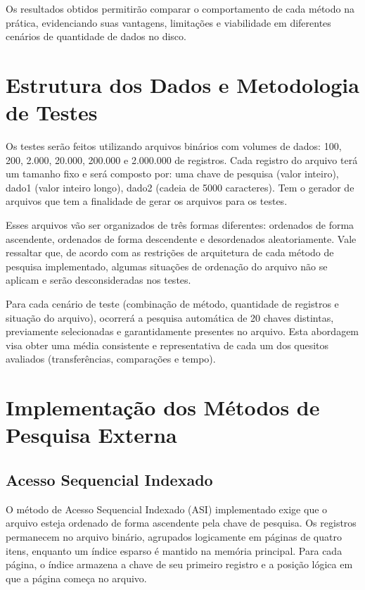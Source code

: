 \documentclass[12pt,a4paper]{article}
\begin{document}
Os resultados obtidos permitirão comparar o comportamento de cada método na prática, evidenciando suas vantagens, limitações e viabilidade em diferentes cenários de quantidade de dados no disco.

\section{Estrutura dos Dados e Metodologia de Testes}

Os testes serão feitos utilizando arquivos binários com volumes de dados: 100, 200, 2.000, 20.000, 200.000 e 2.000.000 de registros. Cada registro do arquivo terá um tamanho fixo e será composto por: uma chave de pesquisa (valor inteiro), dado1 (valor inteiro longo), dado2 (cadeia de 5000 caracteres). Tem o gerador de arquivos que tem a finalidade de gerar os arquivos para os testes. 

Esses arquivos vão ser organizados de três formas diferentes: ordenados de forma ascendente, ordenados de forma descendente e desordenados aleatoriamente. Vale ressaltar que, de acordo com as restrições de arquitetura de cada método de pesquisa implementado, algumas situações de ordenação do arquivo não se aplicam e serão desconsideradas nos testes.

Para cada cenário de teste (combinação de método, quantidade de registros e situação do arquivo), ocorrerá a pesquisa automática de 20 chaves distintas, previamente selecionadas e garantidamente presentes no arquivo. Esta abordagem visa obter uma média consistente e representativa de cada um dos quesitos avaliados (transferências, comparações e tempo).

\section{Implementação dos Métodos de Pesquisa Externa}

\subsection{Acesso Sequencial Indexado}

O método de Acesso Sequencial Indexado (ASI) implementado exige que o arquivo esteja
ordenado de forma ascendente pela chave de pesquisa. Os registros permanecem no arquivo
binário, agrupados logicamente em páginas de quatro itens, enquanto um índice esparso é
mantido na memória principal. Para cada página, o índice armazena a chave de seu primeiro
registro e a posição lógica em que a página começa no arquivo.
\end{document}
